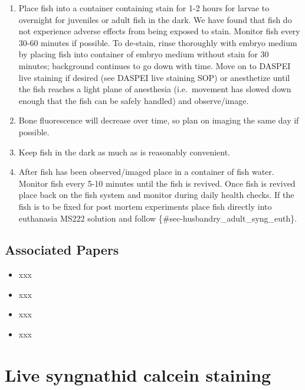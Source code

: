 \documentclass[
  letterpaper,
  DIV=11,
  numbers=noendperiod]{scrreprt}
\providecommand{\tightlist}{%
  \setlength{\itemsep}{0pt}\setlength{\parskip}{0pt}}\usepackage{longtable,booktabs,array}
\begin{document}
\begin{enumerate}
\def\labelenumi{\arabic{enumi}.}
\tightlist
\item
  Place fish into a container containing stain for 1-2 hours for larvae
  to overnight for juveniles or adult fish in the dark. We have found
  that fish do not experience adverse effects from being exposed to
  stain. Monitor fish every 30-60 minutes if possible. To de-stain,
  rinse thoroughly with embryo medium by placing fish into container of
  embryo medium without stain for 30 minutes; background continues to go
  down with time. Move on to DASPEI live staining if desired (see DASPEI
  live staining SOP) or anesthetize until the fish reaches a light plane
  of anesthesia (i.e.~movement has slowed down enough that the fish can
  be safely handled) and observe/image.
\item
  Bone fluorescence will decrease over time, so plan on imaging the same
  day if possible.
\item
  Keep fish in the dark as much as is reasonably convenient.
\item
  After fish has been observed/imaged place in a container of fish
  water. Monitor fish every 5-10 minutes until the fish is revived. Once
  fish is revived place back on the fish system and monitor during daily
  health checks. If the fish is to be fixed for post mortem experiments
  place fish directly into euthanasia MS222 solution and follow
  \{\#sec-husbandry\_adult\_syng\_euth\}.
\end{enumerate}

\hypertarget{associated-papers-38}{%
\section{Associated Papers}\label{associated-papers-38}}

\begin{itemize}
\tightlist
\item
  xxx
\item
  xxx
\item
  xxx
\item
  xxx
\end{itemize}

\hypertarget{sec-vert_exp_live_calcein_syngnathid}{%
\chapter{Live syngnathid calcein
staining}\label{sec-vert_exp_live_calcein_syngnathid}}
\end{document}
